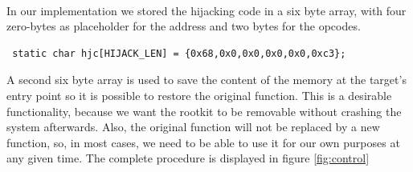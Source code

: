 \hfill\\
In our implementation we stored the hijacking code in a six byte array, with 
four zero-bytes as placeholder for the address and two bytes for the opcodes.
\lstset{style=customc}
\begin{lstlisting}
 static char hjc[HIJACK_LEN] = {0x68,0x0,0x0,0x0,0x0,0xc3};
\end{lstlisting}
A second six byte array is used to save the content of the memory at the 
target's entry point so it is possible to restore the original function.
This is a desirable functionality, because we want the rootkit to be removable 
without crashing the system afterwards. Also, the original function will not be 
replaced by a new function, so, in most cases, we need to be able to use it for 
our own purposes at any given time. The complete procedure is displayed in figure \ref{fig:control}\par

